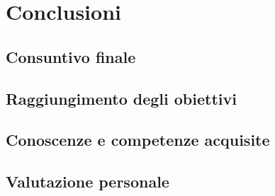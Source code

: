 
\chapter{Conclusioni}
\label{cap:conclusioni}

\section{Consuntivo finale}

\section{Raggiungimento degli obiettivi}

\section{Conoscenze e competenze acquisite}

\section{Valutazione personale}
